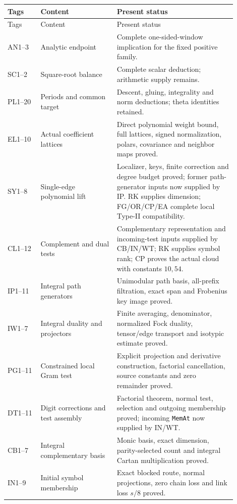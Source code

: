 \documentclass[11pt,a4paper]{article}
\numberwithin{equation}{section}
\theoremstyle{remark}\newtheorem{remark}[theorem]{Remark}
\begin{document}
\begin{longtable}{>{\raggedright\arraybackslash}p{0.13\linewidth}>{\raggedright\arraybackslash}p{0.30\linewidth}>{\raggedright\arraybackslash}p{0.47\linewidth}}
\toprule
Tags & Content & Present status\\
\midrule
\endfirsthead
\toprule
Tags & Content & Present status\\
\midrule
\endhead
AN1--3 & Analytic endpoint & Complete one-sided-window implication for the fixed positive family.\\[3pt]
SC1--2 & Square-root balance & Complete scalar deduction; arithmetic supply remains.\\[3pt]
PL1--20 & Periods and common target & Descent, gluing, integrality and norm deductions; theta identities retained.\\[3pt]
EL1--10 & Actual coefficient lattices & Direct polynomial weight bound, full lattices, signed normalization, polars, covariance and neighbor maps proved.\\[3pt]
SY1--8 & Single-edge polynomial lift & Localizer, keys, finite correction and degree budget proved; former path-generator inputs now supplied by IP. RK supplies dimension; FG/OR/CP/EA complete local Type-II compatibility.\\[3pt]
CL1--12 & Complement and dual tests & Complementary representation and incoming-test inputs supplied by CB/IN/WT; RK supplies symbol rank; CP proves the actual cloud with constants $10,54$.\\[3pt]
IP1--11 & Integral path generators & Unimodular path basis, all-prefix filtration, exact span and Frobenius key image proved.\\[3pt]
IW1--7 & Integral duality and projectors & Finite averaging, denominator, normalized Fock duality, tensor/edge transport and isotypic estimate proved.\\[3pt]
PG1--11 & Constrained local Gram test & Explicit projection and derivative construction, factorial cancellation, source constants and zero remainder proved.\\[3pt]
DT1--11 & Digit corrections and test assembly & Factorial theorem, normal test, selection and outgoing membership proved; incoming \texttt{MemAt} now supplied by IN/WT.\\[3pt]
CB1--7 & Integral complementary basis & Monic basis, exact dimension, parity-selected count and integral Cartan multiplication proved.\\[3pt]
IN1--9 & Initial symbol membership & Exact blocked route, normal projections, zero chain loss and link loss $s/8$ proved.\\[3pt]

\end{longtable}
\end{document}
